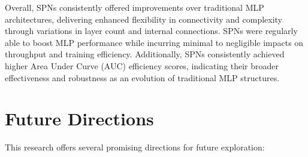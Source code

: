 Overall, SPNs consistently offered improvements over traditional MLP architectures, delivering enhanced flexibility in connectivity and complexity through variations in layer count and internal connections. SPNs were regularly able to boost MLP performance while incurring minimal to negligible impacts on throughput and training efficiency. Additionally, SPNs consistently achieved higher Area Under Curve (AUC) efficiency scores, indicating their broader effectiveness and robustness as an evolution of traditional MLP structures.


\section{Future Directions}

This research offers several promising directions for future exploration:

